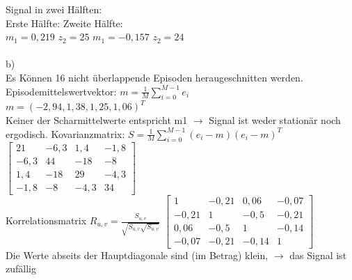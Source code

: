 	Signal in zwei H\"alften:\\
	Erste H\"alfte:	\hspace{5cm}										Zweite H\"alfte:\\
	$m_1 = 0,219$  $z_2 = 25$	\hspace{4cm}								$m_1 = -0,157$  $z_2 = 24$\\
	\\
	b)\\
	Es K\"onnen 16 nicht \"uberlappende Episoden heraugeschnitten werden.
	Episodemittelswertvektor: $m = \frac{1}{M}\sum_{i=0}^{M-1}e_i$\\
	$m = (-2,94, 1,38, 1,25, 1,06)^T$\\
	Keiner der Scharmittelwerte entspricht m1 $\rightarrow$ Signal ist weder station\"ar noch ergodisch.
	\newpage
	Kovarianzmatrix: $S = \frac{1}{M}\sum_{i=0}^{M-1}(e_i-m)(e_i-m)^T$\\
	$
	\begin{bmatrix}
	21   & -6,3 & 1,4	 &  -1,8 \\
	-6,3 & 44 	& -18	 &  -8 \\
	1,4  & -18	& 29 	 & -4,3 \\
	-1,8 & -8 	& -4,3	 &  34
	\end{bmatrix}
	$\\
	Korrelationsmatrix $R_{u,v} = \frac{S_{u,v}}{\sqrt{S_{u,v} \sqrt{S_{u,v}}}}$
	$
	\begin{bmatrix}
	1   & -0,21 & 0,06	 &  -0,07 \\
	-0,21 & 1 	& -0,5	 &  -0,21 \\
	0,06  & -0,5	& 1 	 & -0,14 \\
	-0,07 & -0,21 	& -0,14	 &  1
	\end{bmatrix}
	$\\Die Werte abseits der Hauptdiagonale sind (im Betrag) klein, $\rightarrow$ das Signal ist zuf\"allig\\
